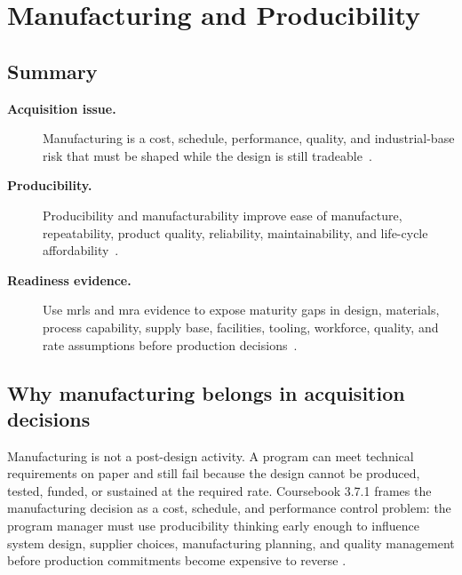 \documentclass[../main.tex]{subfiles}
\begin{document}

\section{Manufacturing and Producibility}

\subsection{Summary}
\begin{description}
  \item[\textbf{Acquisition issue.}] Manufacturing is a cost, schedule, performance, quality, and industrial-base risk that must be shaped while the design is still tradeable~\autocite{edo-3-7-1-manufacturing-producibility-2025,DoD-Producibility-Manufacturability-Guide-2024}.
  \item[\textbf{Producibility.}] Producibility and manufacturability improve ease of manufacture, repeatability, product quality, reliability, maintainability, and life-cycle affordability~\autocite{DoD-Producibility-Manufacturability-Guide-2024}.
  \item[\textbf{Readiness evidence.}] Use \acp{mrl} and \ac{mra} evidence to expose maturity gaps in design, materials, process capability, supply base, facilities, tooling, workforce, quality, and rate assumptions before production decisions~\autocite{DoD-MRL-Deskbook-2025,DoD-Producibility-Manufacturability-Guide-2024}.
\end{description}

\subsection{Why manufacturing belongs in acquisition decisions}

Manufacturing is not a post-design activity.  A program can meet technical
requirements on paper and still fail because the design cannot be produced,
tested, funded, or sustained at the required rate.  Coursebook 3.7.1 frames the
manufacturing decision as a cost, schedule, and performance control problem:
the program manager must use producibility thinking early enough to influence
system design, supplier choices, manufacturing planning, and quality management
before production commitments become expensive to reverse
\autocite{edo-3-7-1-manufacturing-producibility-2025,DoD-Producibility-Manufacturability-Guide-2024}.
\end{document}
